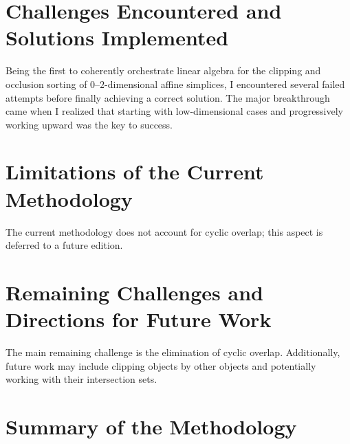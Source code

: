 \section{Challenges Encountered and Solutions Implemented}

Being the first to coherently orchestrate linear algebra for the 
clipping and occlusion sorting of \(0\)--\(2\)-dimensional affine 
simplices, I encountered several failed attempts before finally 
achieving a correct solution. The major breakthrough came when I 
realized that starting with low-dimensional cases and progressively 
working upward was the key to success.

\section{Limitations of the Current Methodology}

The current methodology does not account for cyclic overlap; 
this aspect is deferred to a future edition.

\section{Remaining Challenges and Directions for Future Work}

The main remaining challenge is the elimination of cyclic overlap. 
Additionally, future work may include clipping objects by other objects 
and potentially working with their intersection sets.

\section{Summary of the Methodology}

